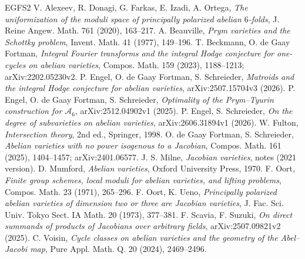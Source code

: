 \documentclass[11pt,a4paper]{article}
\theoremstyle{definition}
\begin{document}
\begin{thebibliography}{EGFS2}
 V. Alexeev, R. Donagi, G. Farkas, E. Izadi, A. Ortega,
\emph{The uniformization of the moduli space of principally polarized abelian
$6$-folds}, J. Reine Angew. Math. 761 (2020), 163--217.
 A. Beauville, \emph{Prym varieties and the Schottky
problem}, Invent. Math. 41 (1977), 149--196.
 T. Beckmann, O. de Gaay Fortman, \emph{Integral Fourier
transforms and the integral Hodge conjecture for one-cycles on abelian
varieties}, Compos. Math. 159 (2023), 1188--1213; arXiv:2202.05230v2.
 P. Engel, O. de Gaay Fortman, S. Schreieder,
\emph{Matroids and the integral Hodge conjecture for abelian varieties},
arXiv:2507.15704v3 (2026).
 P. Engel, O. de Gaay Fortman, S. Schreieder,
\emph{Optimality of the Prym--Tyurin construction for $\mathcal A_6$},
arXiv:2512.04902v1 (2025).
 P. Engel, S. Schreieder, \emph{On the degree of subvarieties
on abelian varieties}, arXiv:2606.31894v1 (2026).
 W. Fulton, \emph{Intersection theory}, 2nd ed., Springer,
1998.
 O. de Gaay Fortman, S. Schreieder, \emph{Abelian
varieties with no power isogenous to a Jacobian}, Compos. Math. 161 (2025),
1404--1457; arXiv:2401.06577.
 J. S. Milne, \emph{Jacobian varieties}, notes (2021 version).
 D. Mumford, \emph{Abelian varieties}, Oxford University
Press, 1970.
 F. Oort, \emph{Finite group schemes, local moduli for
abelian varieties, and lifting problems}, Compos. Math. 23 (1971), 265--296.
 F. Oort, K. Ueno, \emph{Principally polarized abelian
varieties of dimension two or three are Jacobian varieties}, J. Fac. Sci.
Univ. Tokyo Sect. IA Math. 20 (1973), 377--381.
 F. Scavia, F. Suzuki, \emph{On direct summands of products
of Jacobians over arbitrary fields}, arXiv:2507.09821v2 (2025).
 C. Voisin, \emph{Cycle classes on abelian varieties and the
geometry of the Abel--Jacobi map}, Pure Appl. Math. Q. 20 (2024), 2469--2496.
\end{thebibliography}
\end{document}
